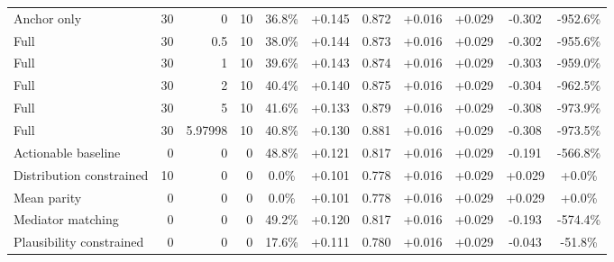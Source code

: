 \begin{table}[htbp]
\begin{tabular}{lrrrccccccc}
Anchor only & 30 & 0 & 10 & 36.8\% & +0.145 & 0.872 & +0.016 & +0.029 & -0.302 & -952.6\% \\
Full & 30 & 0.5 & 10 & 38.0\% & +0.144 & 0.873 & +0.016 & +0.029 & -0.302 & -955.6\% \\
Full & 30 & 1 & 10 & 39.6\% & +0.143 & 0.874 & +0.016 & +0.029 & -0.303 & -959.0\% \\
Full & 30 & 2 & 10 & 40.4\% & +0.140 & 0.875 & +0.016 & +0.029 & -0.304 & -962.5\% \\
Full & 30 & 5 & 10 & 41.6\% & +0.133 & 0.879 & +0.016 & +0.029 & -0.308 & -973.9\% \\
Full & 30 & 5.97998 & 10 & 40.8\% & +0.130 & 0.881 & +0.016 & +0.029 & -0.308 & -973.5\% \\
Actionable baseline & 0 & 0 & 0 & 48.8\% & +0.121 & 0.817 & +0.016 & +0.029 & -0.191 & -566.8\% \\
Distribution constrained & 10 & 0 & 0 & 0.0\% & +0.101 & 0.778 & +0.016 & +0.029 & +0.029 & +0.0\% \\
Mean parity & 0 & 0 & 0 & 0.0\% & +0.101 & 0.778 & +0.016 & +0.029 & +0.029 & +0.0\% \\
Mediator matching & 0 & 0 & 0 & 49.2\% & +0.120 & 0.817 & +0.016 & +0.029 & -0.193 & -574.4\% \\
Plausibility constrained & 0 & 0 & 0 & 17.6\% & +0.111 & 0.780 & +0.016 & +0.029 & -0.043 & -51.8\% \\
\bottomrule
\end{tabular}
\end{table}